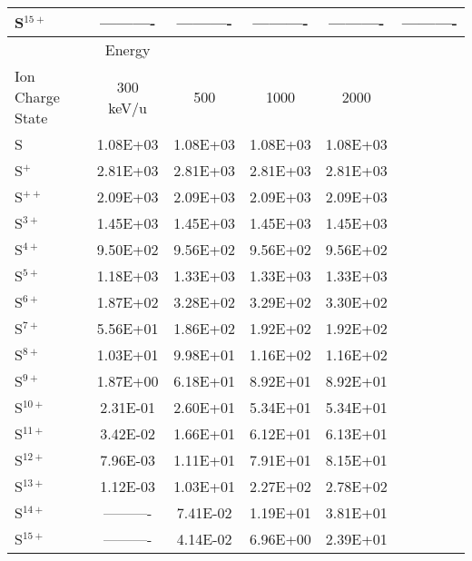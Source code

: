 \begin{table}[ht]
\begin{tabular}{l|c|c|c|c|c}
    S$^{15+}$ & ---------- & ---------- & ---------- & ---------- & ---------- \\
    \hline
    \hline
    & Energy & & & & \\
    Ion Charge State & 300 keV/u & 500 & 1000 & 2000 & \\
    S         & 1.08E+03 & 1.08E+03 & 1.08E+03 & 1.08E+03 & \\
    S$^+$     & 2.81E+03 & 2.81E+03 & 2.81E+03 & 2.81E+03 & \\
    S$^{ ++}$ & 2.09E+03 & 2.09E+03 & 2.09E+03 & 2.09E+03 & \\
    S$^{ 3+}$ & 1.45E+03 & 1.45E+03 & 1.45E+03 & 1.45E+03 & \\
    S$^{ 4+}$ & 9.50E+02 & 9.56E+02 & 9.56E+02 & 9.56E+02 & \\
    S$^{ 5+}$ & 1.18E+03 & 1.33E+03 & 1.33E+03 & 1.33E+03 & \\
    S$^{ 6+}$ & 1.87E+02 & 3.28E+02 & 3.29E+02 & 3.30E+02 & \\
    S$^{ 7+}$ & 5.56E+01 & 1.86E+02 & 1.92E+02 & 1.92E+02 & \\
    S$^{ 8+}$ & 1.03E+01 & 9.98E+01 & 1.16E+02 & 1.16E+02 & \\
    S$^{ 9+}$ & 1.87E+00 & 6.18E+01 & 8.92E+01 & 8.92E+01 & \\
    S$^{10+}$ & 2.31E-01 & 2.60E+01 & 5.34E+01 & 5.34E+01 & \\
    S$^{11+}$ & 3.42E-02 & 1.66E+01 & 6.12E+01 & 6.13E+01 & \\
    S$^{12+}$ & 7.96E-03 & 1.11E+01 & 7.91E+01 & 8.15E+01 & \\
    S$^{13+}$ & 1.12E-03 & 1.03E+01 & 2.27E+02 & 2.78E+02 & \\
    S$^{14+}$ & ---------- & 7.41E-02 & 1.19E+01 & 3.81E+01 & \\
    S$^{15+}$ & ---------- & 4.14E-02 & 6.96E+00 & 2.39E+01 & \\
    \hline
    \end{tabular}
    \label{tab:SulCXProd}
\end{table}


